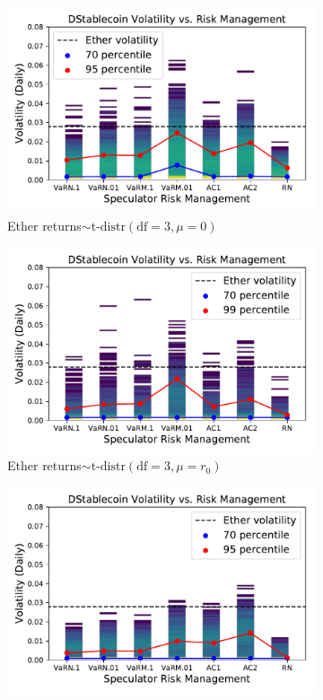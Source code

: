 \begin{figure}
	\centering
	\begin{subfigure}[b]{0.49\textwidth}
		\includegraphics[width=\textwidth]{figures/hist_vol_risk_mgmt_tdist}
		\caption{Ether returns$\sim\text{t-distr}(\text{df}=3,\mu=0)$}\label{fig:hist_vol_risk_mgmt_tdist}
	\end{subfigure}
	\begin{subfigure}[b]{0.49\textwidth}
		\includegraphics[width=\textwidth]{figures/hist_vol_risk_mgmt_drift_nz}
		\caption{Ether returns$\sim\text{t-distr}(\text{df}=3,\mu=r_0)$}\label{fig:hist_vol_risk_mgmt_drift_nz}
	\end{subfigure}
	\begin{subfigure}[b]{0.49\textwidth}
		\includegraphics[width=\textwidth]{figures/hist_vol_risk_mgmt_normal}

\end{subfigure}
\end{figure}
